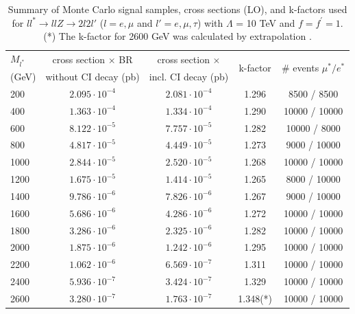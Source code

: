 \begin{table}[h!]
\begin{center}
\begin{tabular}{|l|c|c|c|c|}
\hline
$M_{l^{*}}$ & cross section $\times$ BR & cross section $\times$  & \multirow{2}{*}{k-factor} & \multirow{2}{*}{\# events $\mu^{*} / e^{*}$} \\
(GeV) & without CI decay (pb) & incl. CI decay (pb) &  &  \\
\hline
200 & $2.095\cdot 10^{-4}$ & $2.081\cdot 10^{-4}$ & 1.296 & 8500 / 8500\\
400 & $1.363\cdot 10^{-4}$ & $1.334\cdot 10^{-4}$ & 1.290 & 10000 / 10000\\
600 & $8.122\cdot 10^{-5}$ & $7.757\cdot 10^{-5}$ & 1.282 & 10000 / 8000\\
800 & $4.817\cdot 10^{-5}$ & $4.449\cdot 10^{-5}$ & 1.273 & 9000 / 10000\\
1000 & $2.844\cdot 10^{-5}$ & $2.520\cdot 10^{-5}$ & 1.268 & 10000 / 10000\\
1200 & $1.675\cdot 10^{-5}$ & $1.414\cdot 10^{-5}$ & 1.265 & 8000 / 10000\\
1400 & $9.786\cdot 10^{-6}$ & $7.826\cdot 10^{-6}$ & 1.267 & 9000 / 10000\\
1600 & $5.686\cdot 10^{-6}$ & $4.286\cdot 10^{-6}$ & 1.272 & 10000 / 10000\\
1800 & $3.286\cdot 10^{-6}$ & $2.325\cdot 10^{-6}$ & 1.282 & 10000 / 10000\\
2000 & $1.875\cdot 10^{-6}$ & $1.242\cdot 10^{-6}$ & 1.295 & 10000 / 10000\\
2200 & $1.062\cdot 10^{-6}$ & $6.569\cdot 10^{-7}$ & 1.311 & 10000 / 10000\\
2400 & $5.936\cdot 10^{-7}$ & $3.424\cdot 10^{-7}$ & 1.329 & 10000 / 10000\\
2600 & $3.280\cdot 10^{-7}$ & $1.763\cdot 10^{-7}$ & 1.348(*) & 10000 / 10000\\
\hline

\end{tabular}
\end{center}
\caption{\label{tab:signalsmustar}Summary of Monte Carlo signal samples, cross sections (LO), and k-factors used for $ll^{*} \rightarrow ll Z \rightarrow 2l 2l'$ ($l = e,\mu$ and $l' = e,\mu,\tau$) with $\Lambda$ = 10 TeV and $f = f^{\prime} = 1$. (*) The k-factor for 2600 GeV was calculated by extrapolation \cite{kfactor}. }
\end{table}


